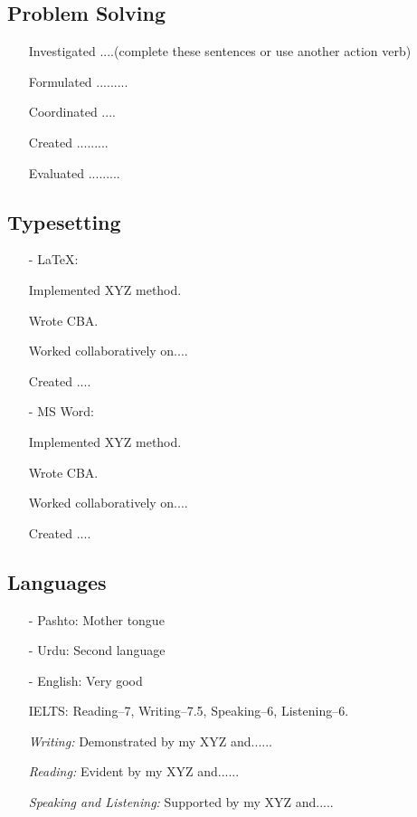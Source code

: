 \documentclass[11pt]{article}
\begin{document}
\subsection{Problem Solving}
\begin{itemize}
    \item[\textbullet] Investigated ....(complete these sentences or use another action verb)
    \item[\textbullet] Formulated .........
    \item[\textbullet] Coordinated ....
    \item[\textbullet] Created .........
    \item[\textbullet] Evaluated .........
\end{itemize}
\subsection{Typesetting}
\begin{itemize}
    \item[-] \textcolor{Sepia}{\LaTeX}: 
    \item[\textbullet] Implemented XYZ method. 
    \item[\textbullet] Wrote CBA. 
    \item[\textbullet] Worked collaboratively on.... 
    \item[\textbullet] Created ....
    \item[-] \textcolor{Sepia}{MS Word}:  
    \item[\textbullet] Implemented XYZ method. 
    \item[\textbullet] Wrote CBA. 
    \item[\textbullet] Worked collaboratively on.... 
    \item[\textbullet] Created ....
\end{itemize}
\subsection{Languages}
\begin{itemize}
    \item[-] \textcolor{Sepia}{Pashto}: Mother tongue
    \item[-] \textcolor{Sepia}{Urdu}: Second language
    \item[-] \textcolor{Sepia}{English}: Very good
        \item[\textbullet] IELTS: Reading--7, Writing--7.5, Speaking--6, Listening--6.
        \item[\textbullet] \textit{Writing:}  Demonstrated by my XYZ and......
        \item[\textbullet] \textit{Reading:}  Evident by my XYZ and......
        \item[\textbullet] \textit{Speaking and Listening:} Supported by my XYZ and.....
    \end{itemize}
\end{document}

